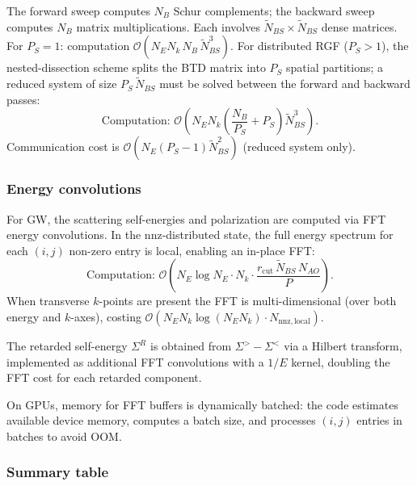 The forward sweep computes $N_B$ Schur complements; the backward
sweep computes $N_B$ matrix multiplications.  Each involves
$\widetilde{N}_{BS}\times\widetilde{N}_{BS}$ dense matrices.  For
$P_S = 1$: computation
$\mathcal{O}(N_E N_k\,N_B\,\widetilde{N}_{BS}^3)$.  For distributed
RGF ($P_S > 1$), the nested-dissection scheme splits the BTD matrix
into $P_S$ spatial partitions; a reduced system of size
$P_S\,\widetilde{N}_{BS}$ must be solved between the forward and
backward passes:
\begin{equation}
  \text{Computation: }
  \mathcal{O}\!\left(N_E N_k\!\left(\frac{N_B}{P_S} + P_S\right)\widetilde{N}_{BS}^3\right).
\end{equation}
Communication cost is $\mathcal{O}(N_E(P_S-1)\widetilde{N}_{BS}^2)$
(reduced system only).

\subsubsection{Energy convolutions}

For GW, the scattering self-energies and polarization are computed via FFT
energy convolutions.  In the nnz-distributed state, the full energy
spectrum for each $(i,j)$ non-zero entry is local, enabling an
in-place FFT:
\begin{equation}
  \text{Computation: }
  \mathcal{O}\!\left(N_E\log N_E \cdot N_k \cdot \frac{r_\mathrm{cut}\,
  \widetilde{N}_{BS}\,N_{AO}}{P}\right).
\end{equation}
When transverse $k$-points are present the FFT is multi-dimensional
(over both energy and $k$-axes), costing
$\mathcal{O}(N_E N_k\log(N_E N_k)\cdot N_\mathrm{nnz,local})$.

The retarded self-energy $\Sigma^R$ is obtained from $\Sigma^>-\Sigma^<$
via a Hilbert transform, implemented as additional FFT convolutions with
a $1/E$ kernel, doubling the FFT cost for each retarded component.

On GPUs, memory for FFT buffers is dynamically batched: the code
estimates available device memory, computes a batch size, and processes
$(i,j)$ entries in batches to avoid OOM.


\subsubsection{Summary table}

